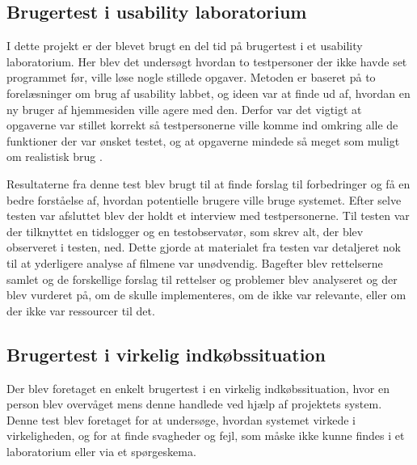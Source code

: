 \subsection{Brugertest i usability laboratorium}
I dette projekt er der blevet brugt en del tid på brugertest i et usability laboratorium. Her blev det undersøgt hvordan to testpersoner der ikke havde set programmet før, ville løse nogle stillede opgaver. Metoden er baseret på to forelæsninger om brug af usability labbet, og ideen var at finde ud af, hvordan en ny bruger af hjemmesiden ville agere med den. Derfor var det vigtigt at opgaverne var stillet korrekt så testpersonerne ville komme ind omkring alle de funktioner der var ønsket testet, og at opgaverne mindede så meget som muligt om realistisk brug \citep{DEBUL}.

Resultaterne fra denne test blev brugt til at finde forslag til forbedringer og få en bedre forståelse af, hvordan potentielle brugere ville bruge systemet. Efter selve testen var afsluttet blev der holdt et interview med testpersonerne. Til testen var der tilknyttet en tidslogger og en testobservatør, som skrev alt, der blev observeret i testen, ned. Dette gjorde at materialet fra testen var detaljeret nok til at yderligere analyse af filmene var unødvendig. Bagefter blev rettelserne samlet og de forskellige forslag til rettelser og problemer blev analyseret og der blev vurderet på, om de skulle implementeres, om de ikke var relevante, eller om der ikke var ressourcer til det.

\subsection{Brugertest i virkelig indkøbssituation}
Der blev foretaget en enkelt brugertest i en virkelig indkøbssituation, hvor en person blev overvåget mens denne handlede ved hjælp af projektets system. Denne test blev foretaget for at undersøge, hvordan systemet virkede i virkeligheden, og for at finde svagheder og fejl, som måske ikke kunne findes i et laboratorium eller via et spørgeskema.
